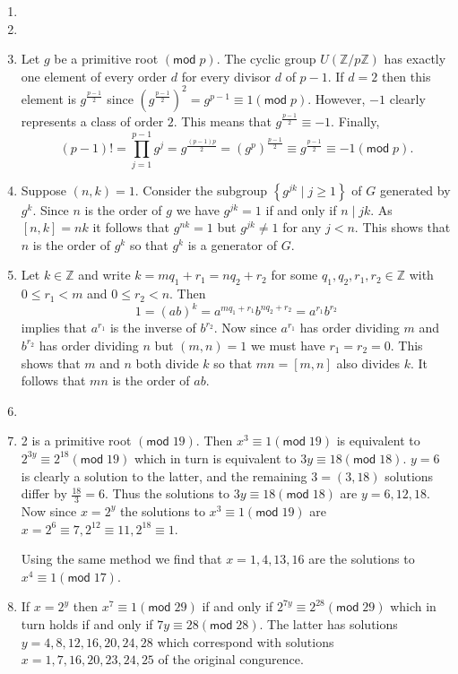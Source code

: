 \documentclass[12pt]{article}
\renewcommand{\pmod}[1]{\left(\mathsf{mod}\;#1\right)}
\begin{document}
\begin{enumerate}
\item %
\item %
\item Let $g$ be a primitive root $\pmod{p}$.
The cyclic group $U\left(\mathbb{Z}/p\mathbb{Z}\right)$
has exactly one element of every order $d$ for every divisor
$d$ of $p-1$. If $d=2$ then this element is $g^{\frac{p-1}{2}}$
since $\left(g^{\frac{p-1}{2}}\right)^2=g^{p-1}\equiv 1\pmod{p}$.
However, $-1$ clearly represents a class of order $2$.
This means that $g^{\frac{p-1}{2}}\equiv -1$.
Finally,
\[\left(p-1\right)!=\prod_{j=1}^{p-1}g^j
=g^{\frac{\left(p-1\right)p}{2}}
=\left(g^p\right)^{\frac{p-1}{2}}
\equiv g^{\frac{p-1}{2}}
\equiv -1\pmod{p}.\]

\item\label{CyclicGenerators} %
Suppose $\left(n,k\right)=1$.
Consider the subgroup 
$\left\{g^{jk}\mid j\ge 1\right\}$
of $G$ generated by $g^k$.
Since $n$ is the order of $g$ we have $g^{jk}=1$
if and only if $n\mid jk$. As $\left[n,k\right]=nk$
it follows that $g^{nk}=1$ but $g^{jk}\ne 1$ for any $j<n$.
This shows that $n$ is the order of $g^k$
so that $g^k$ is a generator of $G$.

\item %
Let $k\in\mathbb{Z}$ and write $k=mq_1+r_1=nq_2+r_2$ for
some $q_1,q_2,r_1,r_2\in\mathbb{Z}$ with $0\le r_1<m$ and $0\le r_2<n$. Then 
\[1=\left(ab\right)^k=a^{mq_1+r_1}b^{nq_2+r_2}=a^{r_1}b^{r_2}\]
implies that $a^{r_1}$ is the inverse of $b^{r_2}$.
Now since $a^{r_1}$ has order dividing $m$ and $b^{r_2}$
has order dividing $n$ but $\left(m,n\right)=1$ we must
have $r_1=r_2=0$. This shows that $m$ and $n$ both divide $k$
so that $mn=\left[m,n\right]$ also divides $k$. It follows
that $mn$ is the order of $ab$.

\item %

\item %
2 is a primitive root $\pmod{19}$. Then $x^3\equiv 1\pmod{19}$
is equivalent to $2^{3y}\equiv 2^{18}\pmod{19}$
which in turn is equivalent to $3y\equiv 18\pmod{18}$.
$y=6$ is clearly a solution to the latter, and the remaining
$3=\left(3,18\right)$ solutions differ by $\frac{18}{3}=6$.
Thus the solutions to $3y\equiv 18\pmod{18}$ are $y=6,12,18$.
Now since $x=2^y$ the solutions to $x^3\equiv 1\pmod{19}$
are $x=2^6\equiv 7,
2^{12}\equiv 11,2^{18}\equiv 1$. 

Using the same method we find that $x=1,4,13,16$ are the solutions
to $x^4\equiv 1\pmod{17}$.

\item\label{X7E29} %
If $x=2^y$ then $x^7\equiv 1\pmod{29}$ if and only
if $2^{7y}\equiv 2^{28}\pmod{29}$ which in turn holds
if and only if $7y\equiv 28\pmod{28}$. The latter has solutions
$y=4,8,12,16,20,24,28$ which correspond with solutions
$x=1,7,16,20,23,24,25$ of the original congurence.


\end{enumerate}
\end{document}
